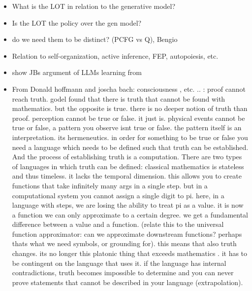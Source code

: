 \begin{itemize}
    \item What is the LOT in relation to the generative model?
    \item Is the LOT the policy over the gen model?
    \item do we need them to be distinct? (PCFG vs Q), Bengio
    \item Relation to self-organization, active inference, FEP, autopoiesis, etc. 
    \item show JBs argument of LLMs learning from 
    \item From Donald hoffmann and joscha bach: consciousness , etc. .. : proof cannot reach truth. godel found that there is truth that cannot be found with mathematics. but the opposite is true. there is no deeper notion of truth than proof. perception cannot be true or false. it just is. physical events cannot be true or false, a pattern you observe isnt true or false. the pattern itself is an interpretation. its hermeneutics. in order for something to be true or false you need a language which needs to be defined such that truth can be established. And the process of establishing truth is a computation. There are two types of languages in which truth can be defined: classical mathematics is stateless and thus timeless. it lacks the temporal dimension. this allows you to create functions that take infinitely many args in a single step. but in a computational system you cannot assign a single digit to pi. here, in a language with steps, we are losing the ability to treat pi as a value. it is now a function we can only approximate to a certain degree. we get a fundamental difference between a value and a function. (relate this to the universal function approximator: can we approximate downstream functions? perhaps thats what we need symbols, or grounding for). this means that also truth changes. its no longer this platonic thing that exceeds mathematics . it has to be contingent on the language that uses it. if the language has internal contradictions, truth becomes impossible to determine and you can never prove statements that cannot be described in your language (extrapolation). 


\end{itemize}
